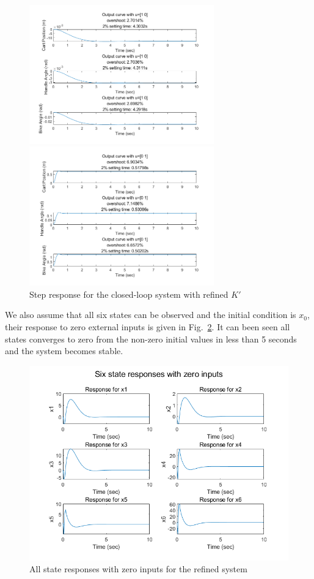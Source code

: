 \documentclass[hyperref]{article}
\theoremstyle{nonumberplain}
\begin{document}
	\begin{figure}[htbp]
		\centering
		\begin{minipage}[t]{0.48\textwidth}
			\centering
			\includegraphics[width=8cm]{fig37.png}
		\end{minipage}
		\begin{minipage}[t]{0.48\textwidth}
			\centering
			\includegraphics[width=8cm]{fig38.png}
		\end{minipage}
		\caption{Step response for the closed-loop system with refined ${K}'$}
		\label{fig4}
	\end{figure}
	 
	We also assume that all six states can be observed and the initial condition is $x_{0}$, their response to zero external inputs is given in Fig.~\ref{fig5}. It can been seen all states converges to zero from the non-zero initial values in less than 5 seconds and the system becomes stable.
	
	\begin{figure}[H]
		\centering
		\includegraphics[width=0.6\linewidth]{fig39.png}
		\caption{All state responses with zero inputs for the refined system}
		\label{fig5}
	\end{figure} 
	
\end{document}
